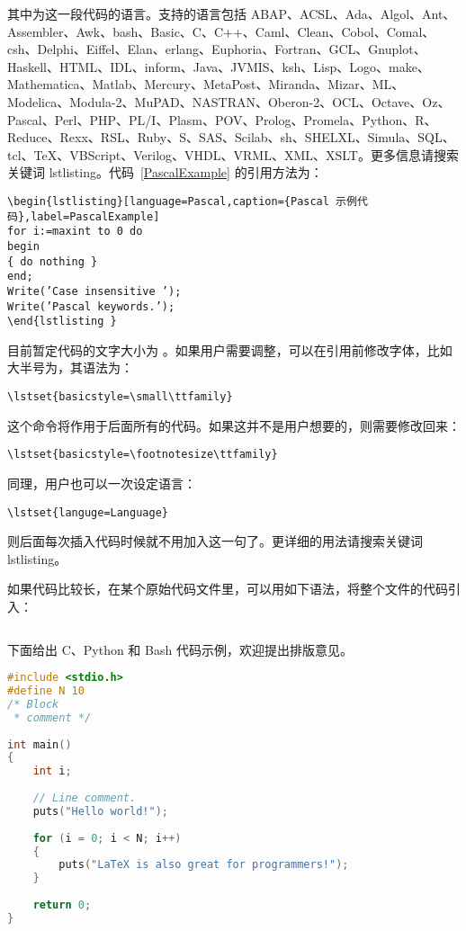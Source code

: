 其中为这一段代码的语言。支持的语言包括 ABAP、ACSL、Ada、Algol、Ant、Assembler、Awk、bash、Basic、C、C++、Caml、Clean、Cobol、Comal、csh、Delphi、Eiffel、Elan、erlang、Euphoria、Fortran、GCL、Gnuplot、Haskell、HTML、IDL、inform、Java、JVMIS、ksh、Lisp、Logo、make、Mathematica、Matlab、Mercury、MetaPost、Miranda、Mizar、ML、Modelica、Modula-2、MuPAD、NASTRAN、Oberon-2、OCL、Octave、Oz、Pascal、Perl、PHP、PL/I、Plasm、POV、Prolog、Promela、Python、R、Reduce、Rexx、RSL、Ruby、S、SAS、Scilab、sh、SHELXL、Simula、SQL、tcl、TeX、VBScript、Verilog、VHDL、VRML、XML、XSLT。更多信息请搜索关键词 lstlisting。代码~\ref{PascalExample} 的引用方法为：
\begin{lstlisting}[language={[LaTeX]TeX},caption={插入代码示例}]
\begin{lstlisting}[language=Pascal,caption={Pascal 示例代码},label=PascalExample]
for i:=maxint to 0 do
begin
{ do nothing }
end;
Write(’Case insensitive ’);
Write(’Pascal keywords.’);
\end{lstlisting }
\end{lstlisting}

目前暂定代码的文字大小为 。如果用户需要调整，可以在引用前修改字体，比如大半号为，其语法为：
\begin{lstlisting}[language={[LaTeX]TeX}]
\lstset{basicstyle=\small\ttfamily}
\end{lstlisting}
这个命令将作用于后面所有的代码。如果这并不是用户想要的，则需要修改回来：
\begin{lstlisting}[language={[LaTeX]TeX}]
\lstset{basicstyle=\footnotesize\ttfamily}
\end{lstlisting}
同理，用户也可以一次设定语言：
\begin{lstlisting}[language={[LaTeX]TeX}]
\lstset{languge=Language}
\end{lstlisting}
则后面每次插入代码时候就不用加入这一句了。更详细的用法请搜索关键词 lstlisting。

如果代码比较长，在某个原始代码文件里，可以用如下语法，将整个文件的代码引入：
\begin{lstlisting}[language={[LaTeX]TeX},caption={引入代码文件示例}]

\end{lstlisting}

下面给出 C、Python 和 Bash 代码示例，欢迎提出排版意见。

\begin{lstlisting}[language=C,caption={C 代码示例},label=cLabel]
#include <stdio.h>
#define N 10
/* Block
 * comment */
 
int main()
{
    int i;
 
    // Line comment.
    puts("Hello world!");
 
    for (i = 0; i < N; i++)
    {
        puts("LaTeX is also great for programmers!");
    }
 
    return 0;
}
\end{lstlisting}

